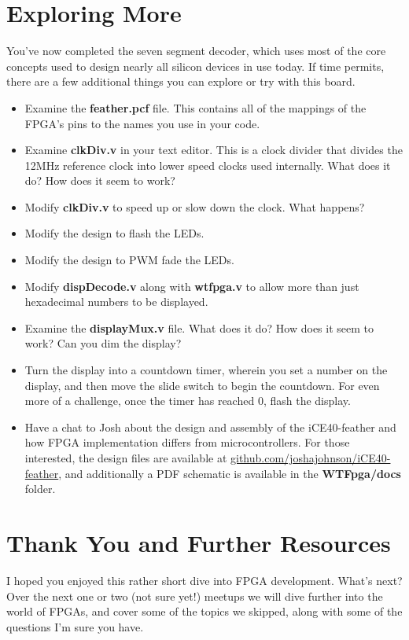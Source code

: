 \documentclass[12pt,a4paper]{article}
\begin{document}
\newpage
\section{Exploring More}
You've now completed the seven segment decoder, which uses most of the core concepts used to design nearly all silicon devices in use today. If time permits, there are a few additional things you can explore or try with this board. 
\begin{itemize}
	\item Examine the \textbf{feather.pcf} file. This contains all of the mappings of the FPGA's pins to the names you use in your code. 
	\item Examine \textbf{clkDiv.v} in your text editor. This is a clock divider that divides the 12MHz reference clock into lower speed clocks used internally. What does it do? How does it seem to work?
	\item Modify \textbf{clkDiv.v} to speed up or slow down the clock. What happens? 
	\item Modify the design to flash the LEDs.
	\item Modify the design to PWM fade the LEDs. 
	\item Modify \textbf{dispDecode.v} along with \textbf{wtfpga.v} to allow more than just hexadecimal numbers to be displayed.
	\item Examine the \textbf{displayMux.v} file. What does it do? How does it seem to work? Can you dim the display? 
	\item Turn the display into a countdown timer, wherein you set a number on the display, and then move the slide switch to begin the countdown. For even more of a challenge, once the timer has reached 0, flash the display.
	\item Have a chat to Josh about the design and assembly of the iCE40-feather and how FPGA implementation differs from microcontrollers. For those interested, the design files are available at \url{github.com/joshajohnson/iCE40-feather}, and additionally a PDF schematic is available in the \textbf{WTFpga/docs} folder.
\end{itemize}

\newpage
\section{Thank You and Further Resources}
I hoped you enjoyed this rather short dive into FPGA development. What's next? Over the next one or two (not sure yet!) meetups we will dive further into the world of FPGAs, and cover some of the topics we skipped, along with some of the questions I'm sure you have. \\
\end{document}
